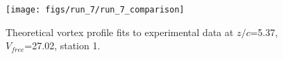 \begin{figure}[H]
\centering
\texttt{[image: figs/run\_7/run\_7\_comparison]}
\caption{Theoretical vortex profile fits to experimental data at $z/c$=5.37, $V_{free}$=27.02, station 1.}
\label{fig:run_7_comparison}
\end{figure}


